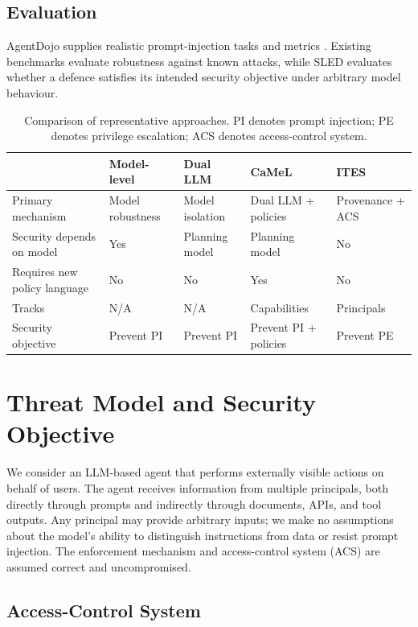 \documentclass{article}
\begin{document}
\subsection{Evaluation}

AgentDojo supplies realistic prompt-injection tasks and metrics
\citep{agentdojo}. Existing benchmarks evaluate robustness against known
attacks, while SLED evaluates whether a defence satisfies its intended
security objective under arbitrary model behaviour.

\begin{table}[h]
\centering
\small
\begin{tabular}{p{2.8cm}p{2.2cm}p{2.2cm}p{2.2cm}p{2.5cm}}
\toprule
& Model-level & Dual LLM & CaMeL & ITES \\
\midrule
Primary mechanism & Model robustness & Model isolation & Dual LLM + policies & Provenance + ACS \\
Security depends on model & Yes & Planning model & Planning model & No \\
Requires new policy language & No & No & Yes & No \\
Tracks & N/A & N/A & Capabilities & Principals \\
Security objective & Prevent PI & Prevent PI & Prevent PI + policies & Prevent PE \\
\bottomrule
\end{tabular}
\caption{Comparison of representative approaches. PI denotes prompt injection; PE denotes privilege escalation; ACS denotes access-control system.}
\label{tab:comparison}
\end{table}




\section{Threat Model and Security Objective}

We consider an LLM-based agent that performs externally visible actions on
behalf of users. The agent receives information from multiple principals,
both directly through prompts and indirectly through documents, APIs, and
tool outputs. Any principal may provide arbitrary inputs; we make no
assumptions about the model's ability to distinguish instructions from data
or resist prompt injection. The enforcement mechanism and access-control
system (ACS) are assumed correct and uncompromised.

\subsection{Access-Control System}
\end{document}
